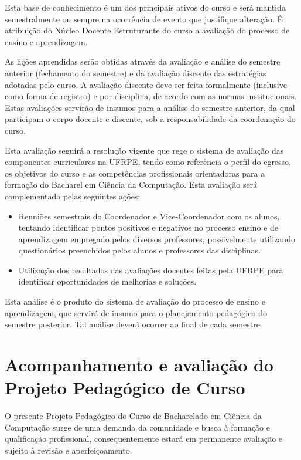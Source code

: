 \documentclass[
	12pt,				%
	openright,			%
  oneside,     %
	a4paper,			%
	english,			%
	french,				%
	spanish,			%
	brazil				%
	]{abntex2}
\begin{document}
Esta base de conhecimento é um dos principais ativos do curso e será mantida semestralmente ou sempre na ocorrência de evento que justifique alteração. É atribuição do Núcleo Docente Estruturante do curso a  avaliação do processo de ensino e aprendizagem.

As lições aprendidas serão obtidas através da avaliação e análise do semestre anterior (fechamento do semestre) e da avaliação 
discente das estratégias adotadas pelo curso. A avaliação discente deve ser feita formalmente (inclusive como forma de 
registro) e por disciplina, de acordo com as normas institucionais. Estas avaliações servirão de insumos para a análise do semestre anterior, da qual participam o corpo docente e discente, sob a responsabilidade da coordenação do curso.

Esta avaliação seguirá a resolução vigente que rege o sistema de avaliação das componentes curriculares na
UFRPE, tendo como referência o perfil do egresso, os objetivos do curso e as competências profissionais orientadoras para a formação do Bacharel em Ciência da Computação. Esta avaliação será complementada pelas seguintes ações:

\begin{itemize}
\item Reuniões semestrais do Coordenador e Vice-Coordenador com os alunos, tentando identificar pontos positivos e negativos no processo ensino e de aprendizagem empregado pelos diversos professores, possivelmente utilizando questionários preenchidos pelos alunos e professores das disciplinas.
\item Utilização dos resultados das avaliações docentes feitas pela UFRPE para identificar oportunidades de melhorias e soluções.
\end{itemize}

Esta análise é o produto do sistema de avaliação do processo de ensino e aprendizagem, que servirá de insumo para o 
planejamento pedagógico do semestre posterior. Tal análise deverá ocorrer ao final de cada semestre.


\section{Acompanhamento e avaliação do Projeto Pedagógico de Curso}


O presente Projeto Pedagógico do Curso de Bacharelado em Ciência da Computação surge de uma demanda da comunidade e busca à formação e qualificação profissional, consequentemente estará em permanente avaliação e sujeito à revisão e aperfeiçoamento.
\end{document}
